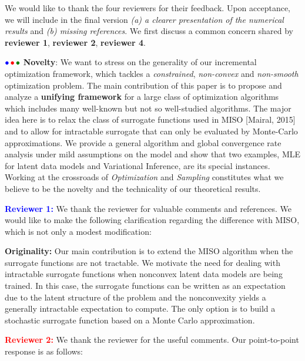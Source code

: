 \documentclass{article}
\begin{document}
We would like to thank the four reviewers for their feedback. Upon acceptance, we will include in the final version \emph{{\sf (a)} a clearer presentation of the numerical results} and \emph{{\sf (b)} missing references}. 
We first discuss a common concern shared by \textbf{\color{blue}reviewer 1}, \textbf{\color{red} reviewer 2},
\textbf{\color{green!50!black}reviewer 4}.\vspace{-3pt}

${\color{blue}\bullet}\!~{\color{red}\bullet}\!~{\color{green!50!black}\bullet}$ \textbf{Novelty}: 
We want to stress on the generality of our incremental optimization framework, which tackles a \emph{constrained}, \emph{non-convex} and \emph{non-smooth} optimization problem. 
The main contribution of this paper is to propose and analyze a \textbf{unifying framework} for a large class of optimization algorithms which includes many well-known but not so well-studied algorithms.
The major idea here is to relax the class of surrogate functions used in MISO [Mairal, 2015] and to allow for intractable surrogate that can only be evaluated by Monte-Carlo approximations.
We provide a general algorithm and global convergence rate analysis under mild assumptions on the model and show that two examples, MLE for latent data models and Variational Inference, are its special instances.
Working at the crossroads of \emph{Optimization} and \emph{Sampling} constitutes what we believe to be the novelty and the technicality of our theoretical results.


\textbf{\textcolor{blue}{Reviewer 1:}} We thank the reviewer for valuable comments and references. We would like to make the following clarification regarding the difference with MISO, which is not only a modest modification:\vspace{-5pt}

\textbf{Originality:} Our main contribution is to extend the MISO algorithm when the surrogate functions are not tractable. 
We motivate the need for dealing with intractable surrogate functions when nonconvex latent data models are being trained. 
In this case, the surrogate functions can be written as an expectation due to the latent structure of the problem and the nonconvexity yields a generally intractable expectation to compute. 
The only option is to build a stochastic surrogate function based on a Monte Carlo approximation.


\textbf{\textcolor{red}{Reviewer 2:}} We thank the reviewer for the useful comments. Our point-to-point response is as follows:\vspace{-5pt}
\end{document}
